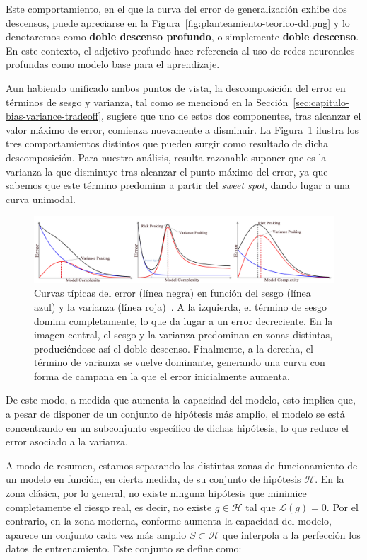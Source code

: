 Este comportamiento, en el que la curva del error de generalización exhibe dos descensos, puede apreciarse en la Figura~\ref{fig:planteamiento-teorico-dd.png} y lo denotaremos como \textbf{doble descenso profundo}, o simplemente \textbf{doble descenso}. En este contexto, el adjetivo profundo hace referencia al uso de redes neuronales profundas como modelo base para el aprendizaje.

Aun habiendo unificado ambos puntos de vista, la descomposición del error en términos de sesgo y varianza, tal como se mencionó en la Sección~\ref{sec:capitulo-bias-variance-tradeoff}, sugiere que uno de estos dos componentes, tras alcanzar el valor máximo de error, comienza nuevamente a disminuir. La Figura~\ref{fig:bias-variance-peak} ilustra los tres comportamientos distintos que pueden surgir como resultado de dicha descomposición. Para nuestro análisis, resulta razonable suponer que es la varianza la que disminuye tras alcanzar el punto máximo del error, ya que sabemos que este término predomina a partir del \textit{sweet spot}, dando lugar a una curva unimodal.

\begin{figure}[h]
    \centering
    \includegraphics[width=0.9\linewidth]{img/bias-variance-peak.png}
    \caption[Curvas típicas del error en función del sesgo y la varianza~\cite{Yang2020}.]{Curvas típicas del error (línea negra) en función del sesgo (línea azul) y la varianza (línea roja)~\cite{Yang2020}. A la izquierda, el término de sesgo domina completamente, lo que da lugar a un error decreciente. En la imagen central, el sesgo y la varianza predominan en zonas distintas, produciéndose así el doble descenso. Finalmente, a la derecha, el término de varianza se vuelve dominante, generando una curva con forma de campana en la que el error inicialmente aumenta.}\label{fig:bias-variance-peak}
\end{figure}

De este modo, a medida que aumenta la capacidad del modelo, esto implica que, a pesar de disponer de un conjunto de hipótesis más amplio, el modelo se está concentrando en un subconjunto específico de dichas hipótesis, lo que reduce el error asociado a la varianza.

A modo de resumen, estamos separando las distintas zonas de funcionamiento de un modelo en función, en cierta medida, de su conjunto de hipótesis $\mathcal{H}$. En la zona clásica, por lo general, no existe ninguna hipótesis que minimice completamente el riesgo real, es decir, no existe $g \in \mathcal{H}$ tal que $\mathcal{L}(g) = 0$. Por el contrario, en la zona moderna, conforme aumenta la capacidad del modelo, aparece un conjunto cada vez más amplio $S \subset \mathcal{H}$ que interpola a la perfección los datos de entrenamiento. Este conjunto se define como:  

